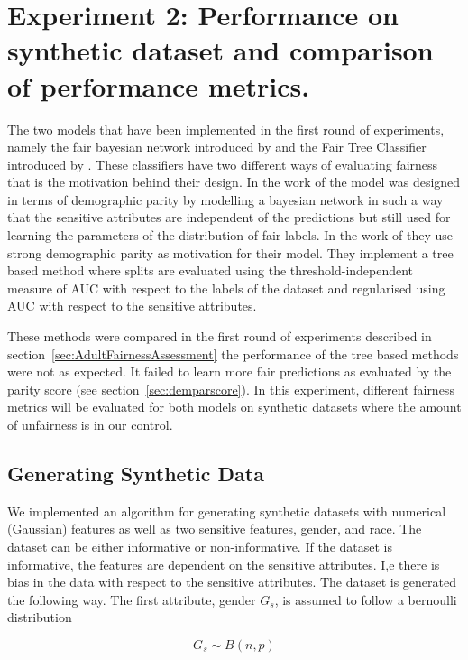 \section{Experiment 2: Performance on synthetic dataset and comparison of performance metrics.}

The two models that have been implemented in the first round of experiments, namely the fair bayesian network introduced by \citet{Choi:2021:AIII} and the Fair Tree Classifier introduced by \citet{Antonio:2021:arXiv}. These classifiers have two different ways of evaluating fairness that is the motivation behind their design. In the work of \citet{Choi:2021:AIII} the model was designed in terms of demographic parity by modelling a bayesian network in such a way that the sensitive attributes are independent of the predictions but still used for learning the parameters of the distribution of fair labels. In the work of \citet{Antonio:2021:arXiv} they use strong demographic parity as motivation for their model. They implement a tree based method where splits are evaluated using the threshold-independent measure of AUC with respect to the labels of the dataset and  regularised using AUC with respect to the sensitive attributes. 

These methods were compared in the first round of experiments described in section~\ref{sec:AdultFairnessAssessment} the performance of the tree based methods were not as expected. It failed to learn more fair predictions as evaluated by the parity score (see section~\ref{sec:demparscore}). In this experiment, different fairness metrics will be evaluated for both models on synthetic datasets where the amount of unfairness is in our control.

\subsection{Generating Synthetic Data}

We implemented an algorithm for generating synthetic datasets with numerical (Gaussian) features as well as two sensitive features, gender, and race. The dataset can be either informative or non-informative. If the dataset is informative, the features are dependent on the sensitive attributes. I,e there is bias in the data with respect to the sensitive attributes. The dataset is generated the following way. The first attribute, gender $G_s$, is assumed to follow a bernoulli distribution

\begin{equation*}
    G_s \sim B(n, p)
\end{equation*}

